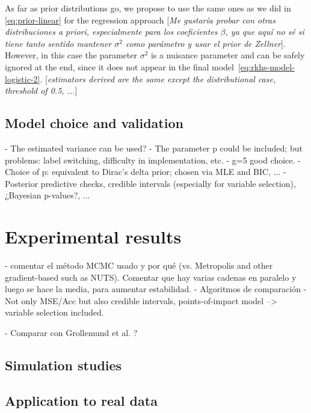 \documentclass[ba]{imsart}
\numberwithin{equation}{section}
\theoremstyle{plain}
\newenvironment{comment}
{
\noindent \em \color{red}
}
{
\color{black}
}
\newcommand\incomment[1]{\color{red}[\textit{#1}]\color{black}}
\begin{document}
As far as prior distributions go, we propose to use the same ones as we did in \eqref{eq:prior-linear} for the regression approach \incomment{Me gustaría probar con otras distribuciones a priori, especialmente para los coeficientes \(\beta\), ya que aquí no sé si tiene tanto sentido mantener \(\sigma^2\) como parámetro y usar el prior de Zellner}. However, in this case the parameter \(\sigma^2\) is a nuisance parameter and can be safely ignored at the end, since it does not appear in the final model~\eqref{eq:rkhs-model-logistic-2}. \incomment{estimators derived are the same except the distributional case, threshold of 0.5, ...}

\subsection{Model choice and validation}\label{sec:model-choice}

\begin{comment}
  - The estimated variance can be used?
  - The parameter p could be included; but problems: label switching, difficulty in implementation, etc.
  - g=5 good choice.
    - Choice of p: equivalent to Dirac's delta prior; chosen via MLE and BIC, ...
  - Posterior predictive checks, credible intervals (especially for variable selection), ¿Bayesian p-values?, ...
\end{comment}



\section{Experimental results}\label{sec:results}

\begin{comment}
  - comentar el método MCMC usado y por qué (vs. Metropolis and other gradient-based such as NUTS). Comentar que hay varias cadenas en paralelo y luego se hace la media, para aumentar estabilidad.
  - Algoritmos de comparación
  - Not only MSE/Acc but also credible intervals, points-of-impact model --> variable selection included.

  - Comparar con Grollemund et al. ?
\end{comment}

\subsection{Simulation studies}

\subsection{Application to real data}
\end{document}
